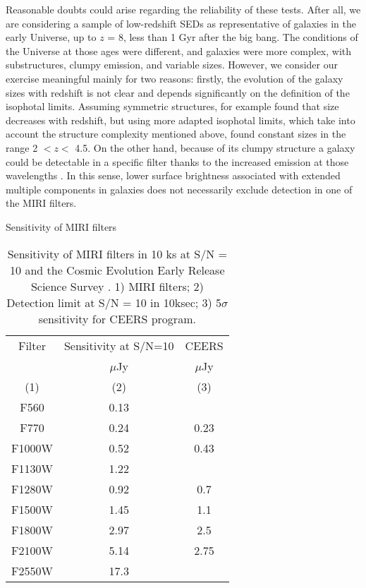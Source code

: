 \documentclass{aa}
\begin{document}
Reasonable doubts could arise regarding the reliability of these tests. After all, we are considering a sample of low-redshift SEDs as representative of galaxies in the early Universe, up to $z$ = 8, less than 1 Gyr after the big bang. The conditions of the Universe at those ages were different, and galaxies were more complex, with substructures, clumpy emission, and variable sizes. However, we consider our exercise meaningful mainly for two reasons: firstly, the evolution of the galaxy sizes with redshift is not clear and depends significantly on the definition of the isophotal limits. Assuming symmetric structures, \cite{shi} for example found that size decreases with redshift, but using more adapted isophotal limits, which take into account the structure complexity mentioned above, \cite{rib} found constant sizes in the range 2 $< z <$ 4.5. On the other hand, because of its clumpy
structure a galaxy  could be detectable in a specific filter thanks to the increased emission at those wavelengths \citep[e.g.][]{sob}. In this sense, lower surface brightness associated with extended multiple components in galaxies does not necessarily exclude detection in one of the MIRI filters.

\begin{table}\centering
Sensitivity of MIRI filters
\begin{tabular}{c|c|c}
\hline
Filter &  Sensitivity at S/N=10 & CEERS\\
       &   $\mu$Jy & $\mu$Jy\\
          (1)  &  (2) & (3)\\
        \hline
        F560 & 0.13    & \\
        F770 & 0.24    & 0.23\\
        F1000W & 0.52  & 0.43\\
        F1130W & 1.22  & \\
        F1280W & 0.92  & 0.7\\
        F1500W & 1.45  & 1.1\\
        F1800W & 2.97  & 2.5\\
        F2100W & 5.14  & 2.75\\
        F2550W & 17.3  &\\
        \hline
    \end{tabular}
    \caption{Sensitivity of MIRI filters in 10 ks at S/N = 10 and the Cosmic Evolution Early Release Science Survey \citep[CEERS,][]{fin}. 1) MIRI filters; 2) Detection limit at S/N = 10 in 10ksec; 3) 5$\sigma$ sensitivity for CEERS program.}\label{miri}
\end{table}
\end{document}
